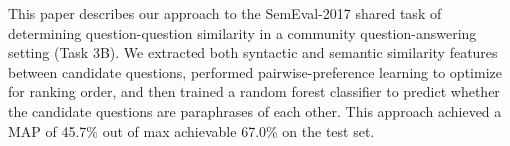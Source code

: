 This paper describes our approach to the SemEval-2017 shared task of determining question-question similarity in a community question-answering setting (Task 3B). We extracted both syntactic and semantic similarity features between candidate questions, performed pairwise-preference learning to optimize for ranking order, and then trained a random forest classifier to predict whether the candidate questions are paraphrases of each other. This approach achieved a MAP of 45.7\% out of max achievable 67.0\% on the test set.
